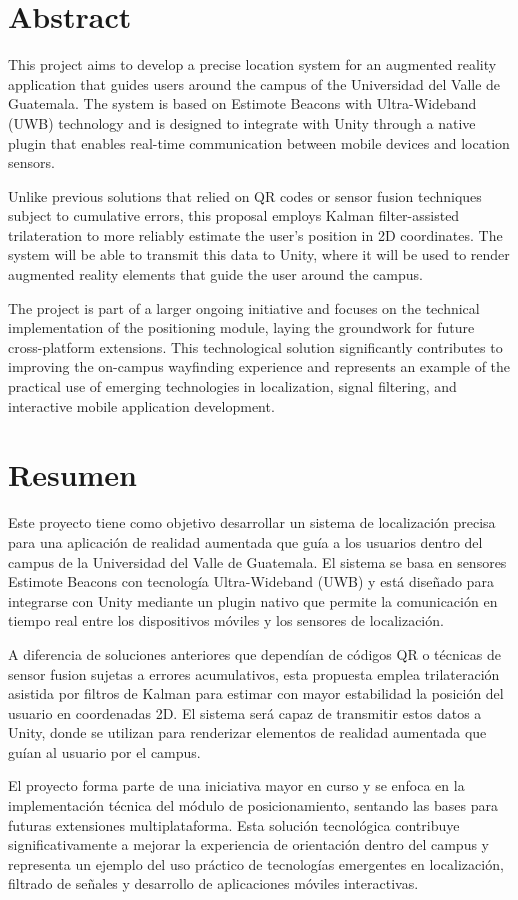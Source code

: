 \documentclass{article}
\begin{document}
\section{Abstract}
{\justify This project aims to develop a precise location system for an augmented reality application that guides users around the campus of the Universidad del Valle de Guatemala. The system is based on Estimote Beacons with Ultra-Wideband (UWB) technology and is designed to integrate with Unity through a native plugin that enables real-time communication between mobile devices and location sensors.

Unlike previous solutions that relied on QR codes or sensor fusion techniques subject to cumulative errors, this proposal employs Kalman filter-assisted trilateration to more reliably estimate the user's position in 2D coordinates. The system will be able to transmit this data to Unity, where it will be used to render augmented reality elements that guide the user around the campus.

The project is part of a larger ongoing initiative and focuses on the technical implementation of the positioning module, laying the groundwork for future cross-platform extensions. This technological solution significantly contributes to improving the on-campus wayfinding experience and represents an example of the practical use of emerging technologies in localization, signal filtering, and interactive mobile application development.}
\newpage

\section{Resumen}
{\justify
Este proyecto tiene como objetivo desarrollar un sistema de localización precisa para una aplicación de realidad aumentada que guía a los usuarios dentro del campus de la Universidad del Valle de Guatemala. El sistema se basa en sensores Estimote Beacons con tecnología Ultra-Wideband (UWB) y está diseñado para integrarse con Unity mediante un plugin nativo que permite la comunicación en tiempo real entre los dispositivos móviles y los sensores de localización.

A diferencia de soluciones anteriores que dependían de códigos QR o técnicas de sensor fusion sujetas a errores acumulativos, esta propuesta emplea trilateración asistida por filtros de Kalman para estimar con mayor estabilidad la posición del usuario en coordenadas 2D. El sistema será capaz de transmitir estos datos a Unity, donde se utilizan para renderizar elementos de realidad aumentada que guían al usuario por el campus.

El proyecto forma parte de una iniciativa mayor en curso y se enfoca en la implementación técnica del módulo de posicionamiento, sentando las bases para futuras extensiones multiplataforma. Esta solución tecnológica contribuye significativamente a mejorar la experiencia de orientación dentro del campus y representa un ejemplo del uso práctico de tecnologías emergentes en localización, filtrado de señales y desarrollo de aplicaciones móviles interactivas.
}
\newpage
\end{document}
